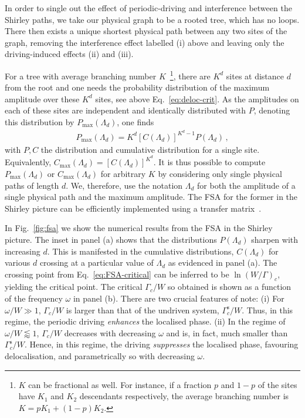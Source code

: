 \documentclass[aps,prl,twocolumn,superscriptaddress,nobalancelastpage,longbibliography]{revtex4-2}
\newcommand\eq[1]{\begin{align}#1\end{align}}
\newcommand{\pmax}[1]{P_{\mathrm{max}}\left(#1\right)}
\newcommand{\cmax}[1]{C_{\mathrm{max}}\left(#1\right)}
\begin{document}
In order to single out the effect of periodic-driving and interference between the Shirley paths, we take our physical graph to be a rooted tree, which has no loops.
There then exists a unique shortest physical path between any two sites of the graph, removing the interference effect labelled (i) above and leaving only the driving-induced effects (ii) and (iii). 




For a tree with average branching number $K$~\footnote{$K$ can be fractional as well. For instance, if a fraction $p$ and $1-p$ of the sites have $K_1$ and $K_2$ descendants respectively, the average branching number is $K=pK_1 + (1-p)K_2$.}, there are $K^d$ sites at distance $d$ from the root and one needs the probability distribution of the maximum amplitude over these $K^d$ sites, see above Eq.~\ref{eq:deloc-crit}. As the amplitudes on each of these sites are independent and identically distributed with $P$, denoting this distribution by $\pmax{\Lambda_d}$, one finds
\eq{
	\pmax{\Lambda_d} = K^d [C(\Lambda_{d})]^{K^d-1}P(\Lambda_{d})\,,
	\label{eq:PLambda-K}
}
with $P,C$ the distribution and cumulative distribution for a single site.
Equivalently, $\cmax{\Lambda_d}=[C(\Lambda_{d})]^{K^d}$. It is thus possible to compute $\pmax{\Lambda_d}$ or $\cmax{\Lambda_d}$ for arbitrary $K$ by considering only single physical paths of length $d$. We, therefore, use the notation $\Lambda_d$ for both the amplitude of a single physical path and the maximum amplitude. The FSA for the former in the Shirley picture can be efficiently implemented using a transfer matrix~\cite{supp}.


In Fig.~\ref{fig:fsa} we show the numerical results from the FSA in the Shirley picture. The inset in panel (a) shows that the distributions $P(\Lambda_d)$ sharpen with increasing $d$. This is manifested in the cumulative distributions, $C(\Lambda_d)$ for various $d$ crossing at a particular value of $\Lambda_d$ as evidenced in panel (a).
The crossing point from Eq.~\ref{eq:FSA-critical} can be inferred to be $\ln(W/\Gamma)_c$, yielding the critical point. The critical $\Gamma_c/W$ so obtained is shown as a function of the frequency $\omega$ in panel (b). 
There are two crucial features of note: (i) For $\omega/W \gg 1$, $\Gamma_c/W$ is larger than that of the undriven system, $\Gamma_c^\mathrm{s}/W$. Thus, in this regime, the periodic driving \emph{enhances} the localised phase.
(ii) In the regime of $\omega/W \lessapprox 1$, $\Gamma_c/W$ decreases with decreasing $\omega$ and is, in fact, much smaller than $\Gamma_c^\mathrm{s}/W$. Hence, in this regime, the driving \emph{suppresses} the localised phase, favouring delocalisation, and parametrically so with decreasing $\omega$. 
\end{document}
